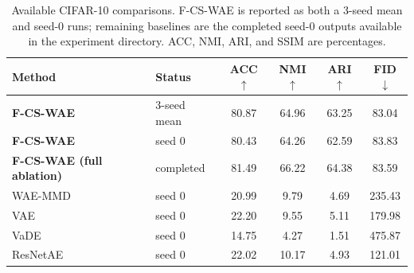 \begin{table}[t]
\centering
\caption{Available CIFAR-10 comparisons. F-CS-WAE is reported as both a 3-seed mean and seed-0 runs; remaining baselines are the completed seed-0 outputs available in the experiment directory. ACC, NMI, ARI, and SSIM are percentages.}
\label{tab:f-cs-wae-cifar10-comparison}
\begin{tabular}{llcccc}
\toprule
Method & Status & ACC$\uparrow$ & NMI$\uparrow$ & ARI$\uparrow$ & FID$\downarrow$ \\
\midrule
\textbf{F-CS-WAE} & 3-seed mean & 80.87 & 64.96 & 63.25 & 83.04 \\
\textbf{F-CS-WAE} & seed 0 & 80.43 & 64.26 & 62.59 & 83.83 \\
\textbf{F-CS-WAE (full ablation)} & completed & 81.49 & 66.22 & 64.38 & 83.59 \\
WAE-MMD & seed 0 & 20.99 & 9.79 & 4.69 & 235.43 \\
VAE & seed 0 & 22.20 & 9.55 & 5.11 & 179.98 \\
VaDE & seed 0 & 14.75 & 4.27 & 1.51 & 475.87 \\
ResNetAE & seed 0 & 22.02 & 10.17 & 4.93 & 121.01 \\
\bottomrule
\end{tabular}
\end{table}
